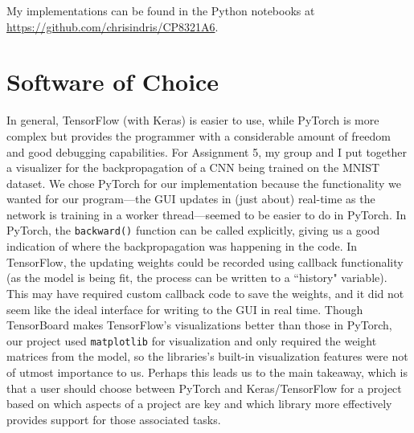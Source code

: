 \documentclass[conference]{IEEEtran}
\begin{document}
My implementations can be found in the Python notebooks at \href{https://github.com/chrisindris/CP8321A6}{https://github.com/chrisindris/CP8321A6}.

\section{Software of Choice}
In general, TensorFlow (with Keras) is easier to use, while PyTorch is more complex but provides the programmer with a considerable amount of freedom and good debugging capabilities. For Assignment 5, my group and I put together a visualizer for the backpropagation of a CNN being trained on the MNIST dataset. We chose PyTorch for our implementation because the functionality we wanted for our program---the GUI updates in (just about) real-time as the network is training in a worker thread---seemed to be easier to do in PyTorch. In PyTorch, the \verb+backward()+ function can be called explicitly, giving us a good indication of where the backpropagation was happening in the code. In TensorFlow, the updating weights could be recorded using callback functionality (as the model is being fit, the process can be written to a ``history" variable). This may have required custom callback code to save the weights, and it did not seem like the ideal interface for writing to the GUI in real time. Though TensorBoard makes TensorFlow's visualizations better than those in PyTorch, our project used \verb+matplotlib+ for visualization and only required the weight matrices from the model, so the libraries's built-in visualization features were not of utmost importance to us. \cite{Terra} Perhaps this leads us to the main takeaway, which is that a user should choose between PyTorch and Keras/TensorFlow for a project based on which aspects of a project are key and which library more effectively provides support for those associated tasks. 

\end{document}

